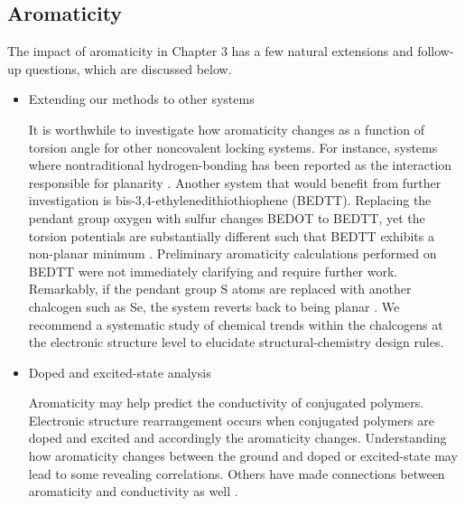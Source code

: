 


\subsection{Aromaticity}

The impact of aromaticity in Chapter 3 has a few natural extensions and follow-up questions, which are discussed below.

\begin{itemize}
  \item Extending our methods to other systems

  It is worthwhile to investigate how aromaticity changes as a function of torsion angle for other noncovalent locking systems. For instance, systems where nontraditional hydrogen-bonding has been reported as the interaction responsible for planarity \cite{Jackson2013}. Another system that would benefit from further investigation is bis-3,4-ethylenedithiothiophene (BEDTT). Replacing the pendant group oxygen with sulfur changes BEDOT to BEDTT, yet the torsion potentials are substantially different such that BEDTT exhibits a non-planar minimum \cite{Conboy2016}. Preliminary aromaticity calculations performed on BEDTT were not immediately clarifying and require further work. Remarkably, if the pendant group S atoms are replaced with another chalcogen such as Se, the system reverts back to being planar \cite{Conboy2016}. We recommend a systematic study of chemical trends within the chalcogens at the electronic structure level to elucidate structural-chemistry design rules.

  \item Doped and excited-state analysis

  Aromaticity may help predict the conductivity of conjugated polymers. Electronic structure rearrangement occurs when conjugated polymers are doped and excited and accordingly the aromaticity changes. Understanding how aromaticity changes between the ground and doped or excited-state may lead to some revealing correlations. Others have made connections between aromaticity and conductivity as well \cite{Chen2014}.

\end{itemize}
